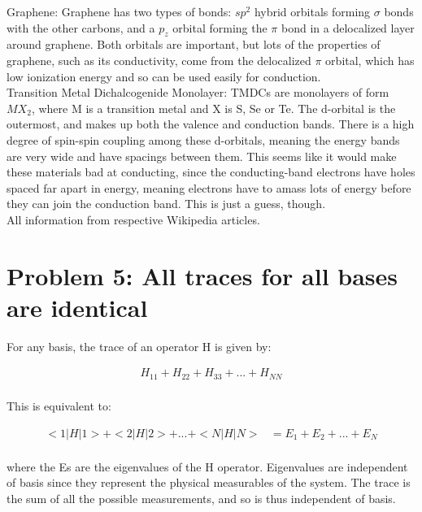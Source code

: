 \documentclass[10pt]{article} %
\begin{document}
Graphene: Graphene has two types of bonds: $sp^2$ hybrid orbitals forming $\sigma$
bonds with the other carbons, and a $p_z$ orbital forming the $\pi$ bond in a
delocalized layer around graphene. Both orbitals are important, but lots of the
properties of graphene, such as its conductivity, come from the delocalized
$\pi$ orbital, which has low ionization energy and so can be used easily for
conduction.\\

Transition Metal Dichalcogenide Monolayer: TMDCs are monolayers of form $MX_2$, where
M is a transition metal and X is S, Se or Te. The d-orbital is the outermost, and
makes up both the valence and conduction bands. There is a high degree of spin-spin
coupling among these d-orbitals, meaning the energy bands are very wide and have
spacings between them. This seems like it would make these materials bad at
conducting, since the conducting-band electrons have holes spaced far apart in energy,
meaning electrons have to amass lots of energy before they can join the conduction
band. This is just a guess, though.\\

All information from respective Wikipedia articles.\\

\section{Problem 5: All traces for all bases are identical}
For any basis, the trace of an operator H is given by:

\begin{align*}
  H_{11} + H_{22} + H_{33} + ... + H_{NN}\\
\end{align*}

This is equivalent to:

\begin{align*}
  <1|H|1> + <2|H|2> + ... + <N|H|N> &= E_1 + E_2 + ... + E_N\\
\end{align*}

where the Es are the eigenvalues of the H operator. Eigenvalues are independent
of basis since they represent the physical measurables of the system. The trace is the
sum of all the possible measurements, and so is thus independent of basis.\\
\end{document}
